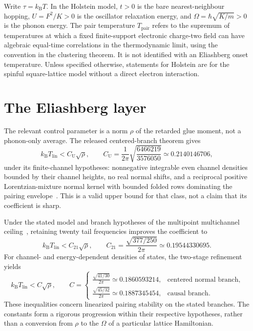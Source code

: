 \documentclass[11pt]{article}
\newcommand{\kb}{k_{\mathrm B}}
\newcommand{\Tlin}{T_{\mathrm{lin}}}
\begin{document}
Write $\tau=\kb T$. In the Holstein model, $t>0$ is the bare nearest-neighbour hopping, $U=F^2/K>0$ is the oscillator relaxation energy, and $\Omega=\hbar\sqrt{K/m}>0$ is the phonon energy. The pair temperature $T_{\mathrm{pair}}$ refers to the supremum of temperatures at which a fixed finite-support electronic charge-two field can have algebraic equal-time correlations in the thermodynamic limit, using the convention in the clustering theorem. It is not identified with an Eliashberg onset temperature. Unless specified otherwise, statements for Holstein are for the spinful square-lattice model without a direct electron interaction.

\section{The Eliashberg layer}

The relevant control parameter is a norm $\rho$ of the retarded glue moment, not a phonon-only average. The released centered-branch theorem gives
\[
 \kb\Tlin < C_{\mathrm U}\sqrt{\rho},\qquad
 C_{\mathrm U}=\frac{1}{2\pi}\sqrt{\frac{6466219}{3576050}}\simeq0.2140146706,
\]
under its finite-channel hypotheses: nonnegative integrable even channel densities bounded by their channel heights, no real normal shifts, and a reciprocal positive Lorentzian-mixture normal kernel with bounded folded rows dominating the pairing envelope~\cite{univglue}. This is a valid upper bound for that class, not a claim that its coefficient is sharp.

Under the stated model and branch hypotheses of the multipoint multichannel ceiling~\cite{optimum}, retaining twenty tail frequencies improves the coefficient to
\[
 \kb\Tlin < C_{21}\sqrt{\rho},\qquad
 C_{21}=\frac{\sqrt{377/250}}{2\pi}\simeq0.19544330695.
\]
For channel- and energy-dependent densities of states, the two-stage refinement~\cite{finiteenergy} yields
\[
 \kb\Tlin < C\sqrt{\rho},\qquad
 C=\begin{cases}
 \displaystyle\frac{\sqrt{41/30}}{2\pi}\simeq0.1860593214,&\text{centered normal branch},\\[5pt]
 \displaystyle\frac{\sqrt{45/32}}{2\pi}\simeq0.1887345454,&\text{causal branch}.
 \end{cases}
\]
These inequalities concern linearized pairing stability on the stated branches. The constants form a rigorous progression within their respective hypotheses, rather than a conversion from $\rho$ to the $\Omega$ of a particular lattice Hamiltonian.
\end{document}
